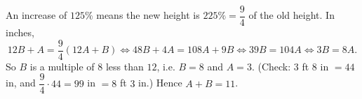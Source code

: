 An increase of $125\%$ means the new height is $225\%=\dfrac94$ of the old height. In inches,
\[12B+A=\dfrac94(12A+B)\iff48B+4A=108A+9B\iff39B=104A\iff3B=8A.\]
So $B$ is a multiple of $8$ less than $12$, i.e. $B=8$ and $A=3$. (Check: $3$ ft $8$ in $=44$ in, and $\dfrac94\cdot44=99$ in $=8$ ft $3$ in.) Hence $A+B=\boxed{11}$.
